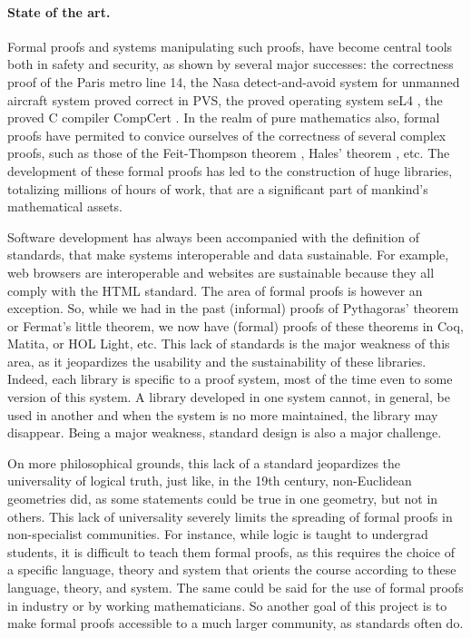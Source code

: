 \paragraph{State of the art.}
Formal proofs and systems manipulating such proofs, have become
central tools both in safety and security, as shown by several major
successes: the correctness proof of the Paris metro line 14, the Nasa
detect-and-avoid system for unmanned aircraft system proved correct in
PVS, the proved operating system seL4 \cite{Klein09}, the proved C
compiler CompCert \cite{Leroy06}.  In the realm of pure mathematics
also, formal proofs have permited to convice ourselves of the
correctness of several complex proofs, such as those of the Feit-Thompson
theorem \cite{Gonthier13}, Hales' theorem
\cite{Hales17}, etc.  The development of these formal proofs has led
to the construction of huge libraries, totalizing millions of hours of
work, that are a significant part of mankind's mathematical assets.

Software development has always been accompanied with the definition
of standards, that make systems interoperable and data
sustainable. For example, web browsers are interoperable and websites
are sustainable because they all comply with the HTML standard. The
area of formal proofs is however an exception. So, while we had in the
past (informal) proofs of Pythagoras' theorem or Fermat's little
theorem, we now have (formal) proofs of these theorems in {\sc Coq},
{\sc Matita}, or {\sc HOL Light}, etc. This lack of standards is the
major weakness of this area, as it jeopardizes the usability and the
sustainability of these libraries. Indeed, each library is specific to
a proof system, most of the time even to some version of this
system. A library developed in one system cannot, in general, be used
in another and when the system is no more maintained, the library may
disappear. Being a major weakness, standard design is also a major
challenge.

On more philosophical grounds, this lack of a standard jeopardizes the
universality of logical truth, just like, in the 19th century,
non-Euclidean geometries did, as some statements could be true in one
geometry, but not in others.  This lack of universality severely
limits the spreading of formal proofs in non-specialist
communities. For instance, while logic is taught to undergrad
students, it is difficult to teach them formal proofs, as this
requires the choice of a specific language, theory and system that
orients the course according to these language, theory, and
system. The same could be said for the use of formal proofs in
industry or by working mathematicians. So another goal of this project
is to make formal proofs accessible to a much larger community, as
standards often do.

